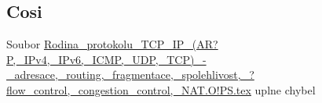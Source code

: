 \subsection{Cosi}

Soubor \url{Rodina_protokolu_TCP_IP_(AR?P,_IPv4,_IPv6,_ICMP,_UDP,_TCP)_-_adresace,_routing,_fragmentace,_spolehlivost,_?flow_control,_congestion_control,_NAT.O!PS.tex}
 uplne chybel